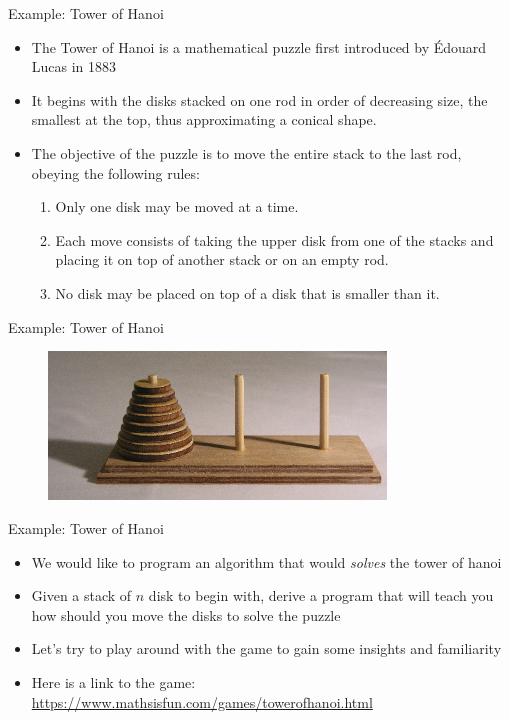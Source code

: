 \documentclass[10pt,xcolor={table,dvipsnames},t]{beamer}
\begin{document}
\begin{frame}{Example: Tower of Hanoi}
      \begin{itemize}
        \item The Tower of Hanoi is a mathematical puzzle first introduced by Édouard Lucas in 1883
        \item It begins with the disks stacked on one rod in order of decreasing size, the smallest at the top, thus approximating a conical shape. 
         \item The objective of the puzzle is to move the entire stack to the last rod, obeying the following rules: 
        \begin{enumerate}
          \item Only one disk may be moved at a time.
          \item Each move consists of taking the upper disk from one of the stacks and placing it on top of another stack or on an empty rod.
          \item No disk may be placed on top of a disk that is smaller than it.
        \end{enumerate}
      \end{itemize}
\end{frame}

\begin{frame}{Example: Tower of Hanoi}
  \begin{figure}
    \includegraphics[width=0.8\textwidth]{img/hanoi.jpeg}
  \end{figure}
\end{frame}

\begin{frame}{Example: Tower of Hanoi}
  \begin{itemize}
    \item We would like to program an algorithm that would \textit{solves} the tower of hanoi
    \item Given a stack of $n$ disk to begin with, derive a program that will teach you how should you move the disks to solve the puzzle
    \item Let's try to play around with the game to gain some insights and familiarity
    \item Here is a link to the game: \href{https://www.mathsisfun.com/games/towerofhanoi.html}{https://www.mathsisfun.com/games/towerofhanoi.html}
  \end{itemize}
\end{frame}
\end{document}
